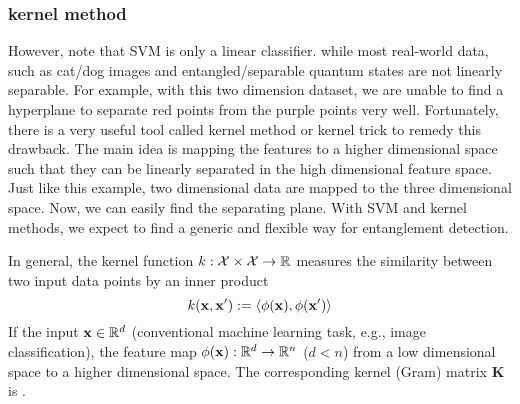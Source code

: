 \subsubsection{kernel method}
However, note that SVM is only a linear classifier. while most real-world data, such as cat/dog images and entangled/separable quantum states are not linearly separable. For example, with this two dimension dataset, we are unable to find a hyperplane to separate red points from the purple points very well. Fortunately, there is a very useful tool called kernel method or kernel trick to remedy this drawback. The main idea is mapping the features to a higher dimensional space such that  they can be linearly separated in the high dimensional feature space. Just like this example, two dimensional data are mapped to the three dimensional space. Now, we can easily find the separating plane. With SVM and kernel methods, we expect to find a generic and flexible way for entanglement detection.
\begin{definition}[kernel]\label{def:kernel}
	In general, the kernel function $k:\mathcal{X}\times \mathcal{X} \to \mathbb{R}$ measures the similarity between two input data points by an inner product
	\begin{equation}
		k (\vb{x},\vb{x}') : = \expval{\phi(\vb{x}),\phi(\vb{x}')}
	\end{equation}
	If the input $\vb{x}\in \mathbb{R}^d$ (conventional machine learning task, e.g., image classification), the feature map $\phi(\vb{x}): \mathbb{R}^d\to \mathbb{R}^n$ ($d < n$) from a low dimensional space to a higher dimensional space.
	The corresponding kernel (Gram) matrix $\mathbf{K}$ is .
\end{definition}
